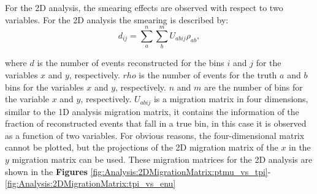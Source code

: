 For the 2D analysis, the smearing effects are observed with respect to two variables. For the 2D analysis the smearing is described by:
\begin{equation}
    d_{ij}=\sum^{n}_{a}\sum^{m}_{b}U_{abij}\rho_{ab},
    \label{eq:Analysis:unfolding:SmearingEq2D}
\end{equation}

where $d$ is the number of events reconstructed for the bins $i$ and $j$ for the variables $x$ and $y$, respectively. $rho$ is the number of events for the truth $a$ and $b$ bins for the variables $x$ and $y$, respectively. $n$ and $m$ are the number of bins for the variable $x$ and $y$, respectively. $U_{abij}$ is a migration matrix in four dimensions, similar to the 1D analysis migration matrix, it contains the information of the fraction of reconstructed events that fall in a true bin, in this case it is observed as a function of two variables. For obvious reasons, the four-dimensional matrix cannot be plotted, but the projections of the 2D migration matrix of the $x$ in the $y$ migration matrix can be used. These migration matrices for the 2D analysis are shown in the \textbf{Figures} \ref{fig:Analysis:2DMigrationMatrix:ptmu_vs_tpi}-\ref{fig:Analysis:2DMigrationMatrix:tpi_vs_enu}

